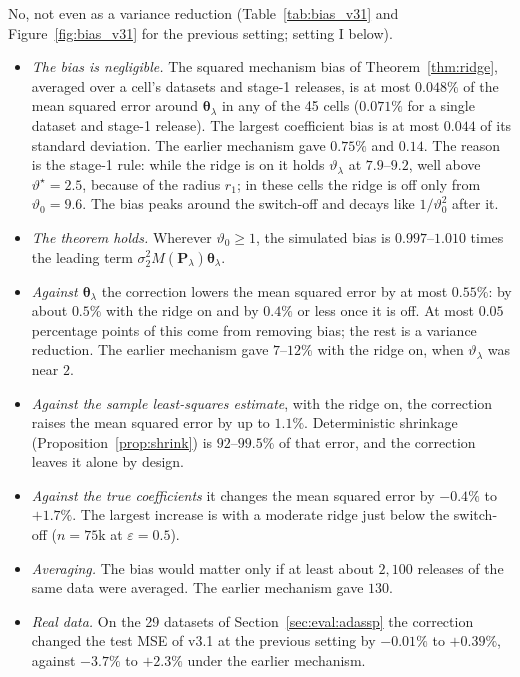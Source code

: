 \documentclass[11pt]{article}
\theoremstyle{definition}
\theoremstyle{plain}
\newcommand{\btheta}{\boldsymbol{\theta}}
\newcommand{\bP}{\mathbf{P}}
\begin{document}
No, not even as a variance reduction (Table~\ref{tab:bias_v31} and Figure~\ref{fig:bias_v31} for the previous setting; setting I below).
\begin{itemize}[noitemsep]
  \item \emph{The bias is negligible.} The squared mechanism bias of Theorem~\ref{thm:ridge}, averaged over a cell's datasets and stage-1 releases, is at most $0.048\%$ of the mean squared error around $\btheta_\lambda$ in any of the 45 cells ($0.071\%$ for a single dataset and stage-1 release). The largest coefficient bias is at most $0.044$ of its standard deviation. The earlier mechanism gave $0.75\%$ and $0.14$. The reason is the stage-1 rule: while the ridge is on it holds $\vartheta_\lambda$ at $7.9$--$9.2$, well above $\vartheta^\star = 2.5$, because of the radius $r_1$; in these cells the ridge is off only from $\vartheta_0 = 9.6$. The bias peaks around the switch-off and decays like $1/\vartheta_0^2$ after it.
  \item \emph{The theorem holds.} Wherever $\vartheta_0 \ge 1$, the simulated bias is $0.997$--$1.010$ times the leading term $\sigma_2^2 M(\bP_\lambda)\btheta_\lambda$.
  \item \emph{Against $\btheta_\lambda$} the correction lowers the mean squared error by at most $0.55\%$: by about $0.5\%$ with the ridge on and by $0.4\%$ or less once it is off. At most $0.05$ percentage points of this come from removing bias; the rest is a variance reduction. The earlier mechanism gave $7$--$12\%$ with the ridge on, when $\vartheta_\lambda$ was near $2$.
  \item \emph{Against the sample least-squares estimate}, with the ridge on, the correction raises the mean squared error by up to $1.1\%$. Deterministic shrinkage (Proposition~\ref{prop:shrink}) is $92$--$99.5\%$ of that error, and the correction leaves it alone by design.
  \item \emph{Against the true coefficients} it changes the mean squared error by $-0.4\%$ to $+1.7\%$. The largest increase is with a moderate ridge just below the switch-off ($n = 75$k at $\varepsilon = 0.5$).
  \item \emph{Averaging.} The bias would matter only if at least about $2{,}100$ releases of the same data were averaged. The earlier mechanism gave $130$.
  \item \emph{Real data.} On the 29 datasets of Section~\ref{sec:eval:adassp} the correction changed the test MSE of v3.1 at the previous setting by $-0.01\%$ to $+0.39\%$, against $-3.7\%$ to $+2.3\%$ under the earlier mechanism.
\end{itemize}
\end{document}

